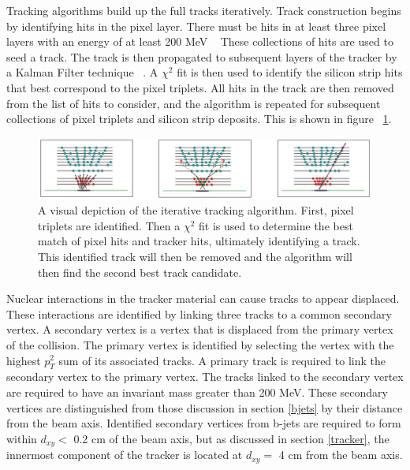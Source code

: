\documentclass[oneside, letterpaper, oldfontcommands]{memoir}
\begin{document}
\qquad Tracking algorithms build up the full tracks iteratively. Track construction begins by identifying hits in the pixel layer. There must be hits in at least three pixel layers with an energy of at least 200 MeV ~\cite{Chatrchyan:2014fea} These collections of hits are used to seed a track. The track is then propagated to subsequent layers of the tracker by a Kalman Filter technique ~\cite{Fruhwirth:1987fm}. A $\chi^2$ fit is then used to identify the silicon strip hits that best correspond to the pixel triplets. All hits in the track are then removed from the list of hits to consider, and the algorithm is repeated for subsequent collections of pixel triplets and silicon strip deposits. This is shown in figure ~\ref{fig:iteratetrack}.

\begin{figure}[here]
\includegraphics[width=1.1\textwidth]{iterative_tracking.jpg}
\caption{A visual depiction of the iterative tracking algorithm\cite{Tosi:1956757}. First, pixel triplets are identified. Then a $\chi^{2}$ fit is used to determine the best match of pixel hits and tracker hits, ultimately identifying a track. This identified track will then be removed and the algorithm will then find the second best track candidate. }
\label{fig:iteratetrack}
\end{figure}


\qquad Nuclear interactions in the tracker material can cause tracks to appear displaced. These interactions are identified by linking three tracks to a common secondary vertex. A secondary vertex is a vertex that is displaced from the primary vertex of the collision. The primary vertex is identified by selecting the vertex with the highest $p_{T}^{2}$ sum of its associated tracks. A primary track is required to link the secondary vertex to the primary vertex. The tracks linked to the secondary vertex are required to have an invariant mass greater than 200 MeV. These secondary vertices are distinguished from those discussion in section \ref{bjets} by their distance from the beam axis. Identified secondary vertices from b-jets are required to form within $d_{xy} <$ 0.2 cm of the beam axis, but as discussed in section \ref{tracker}, the innermost component of the tracker is located at $d_{xy} =$ 4 cm from the beam axis. 
\end{document}
